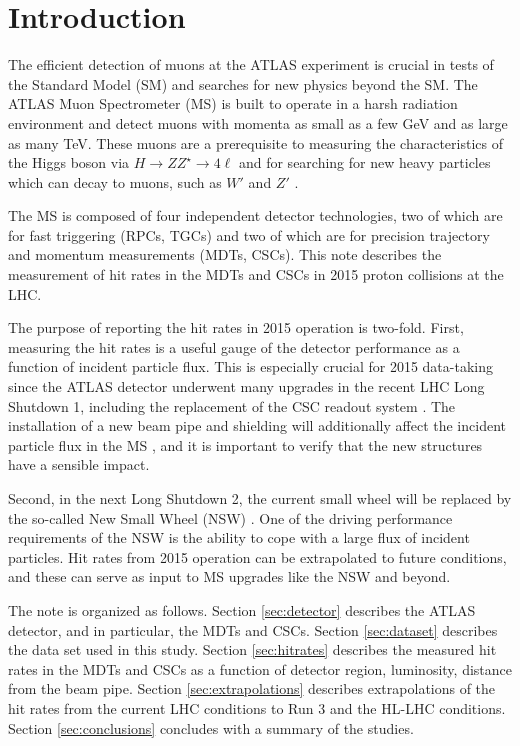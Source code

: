 \section{Introduction}
\label{sec:intro}

The efficient detection of muons at the ATLAS experiment is crucial in tests of the Standard Model (SM) and searches for new physics beyond the SM. The ATLAS Muon Spectrometer (MS) \cite{PERF-2007-01} is built to operate in a harsh radiation environment and detect muons with momenta as small as a few GeV and as large as many TeV. These muons are a prerequisite to measuring the characteristics of the Higgs boson via $H\rightarrow ZZ^\star\rightarrow 4\ell$ \cite{HIGG-2013-12} and for searching for new heavy particles which can decay to muons, such as $W'$ and $Z'$ \cite{EXOT-2013-10,EXOT-2012-23}. 

The MS is composed of four independent detector technologies, two of which are for fast triggering (RPCs, TGCs) and two of which are for precision trajectory and momentum measurements (MDTs, CSCs). This note describes the measurement of hit rates in the MDTs and CSCs in 2015 proton collisions at the LHC. 


The purpose of reporting the hit rates in 2015 operation is two-fold. First, measuring the hit rates is a useful gauge of the detector performance as a function of incident particle flux. This is especially crucial for 2015 data-taking since the ATLAS detector underwent many upgrades in the recent LHC Long Shutdown 1, including the replacement of the CSC readout system \cite{atlas-csc-readout}. The installation of a new beam pipe and shielding will additionally affect the incident particle flux in the MS \cite{ATL-COM-MUON-2014-027}, and it is important to verify that the new structures have a sensible impact.

Second, in the next Long Shutdown 2, the current small wheel will be replaced by the so-called New Small Wheel (NSW) \cite{CERN-LHCC-2013-006}. One of the driving performance requirements of the NSW is the ability to cope with a large flux of incident particles. Hit rates from 2015 operation can be extrapolated to future conditions, and these can serve as input to MS upgrades like the NSW and beyond.

The note is organized as follows. Section \ref{sec:detector} describes the ATLAS detector, and in particular, the MDTs and CSCs. Section \ref{sec:dataset} describes the data set used in this study. Section \ref{sec:hitrates} describes the measured hit rates in the MDTs and CSCs as a function of detector region, luminosity, distance from the beam pipe. Section \ref{sec:extrapolations} describes extrapolations of the hit rates from the current LHC conditions to Run 3 and the HL-LHC conditions. Section \ref{sec:conclusions} concludes with a summary of the studies.


